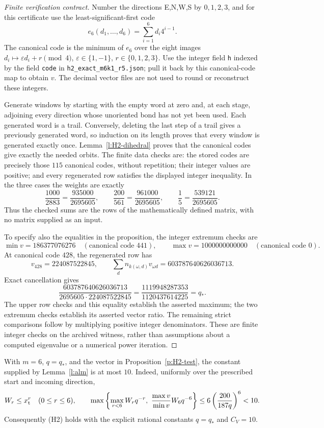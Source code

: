 \begin{proof}[Finite verification contract]
Number the directions E,N,W,S by \(0,1,2,3\), and for this
certificate use the least-significant-first code
\[
 e_6(d_1,\ldots,d_6)=\sum_{i=1}^6d_i4^{i-1}.
\]
The canonical code is the minimum of \(e_6\) over the eight images
\(d_i\mapsto \varepsilon d_i+r\pmod4\),
\(\varepsilon\in\{1,-1\}\), \(r\in\{0,1,2,3\}\).
Use the integer field \texttt{h} indexed by the field \texttt{code}
in \texttt{h2\_exact\_m6k1\_r5.json}; pull it back by this
canonical-code map to obtain \(v\). The decimal vector files are
not used to round or reconstruct these integers.

Generate windows by starting with the empty word at zero and,
at each stage, adjoining every direction whose unoriented bond has
not yet been used. Each generated word is a trail. Conversely,
deleting the last step of a trail gives a previously generated word,
so induction on its length proves that every window is generated
exactly once. Lemma~\ref{l:H2-dihedral} proves that the canonical
codes give exactly the needed orbits. The finite data checks are:
the stored codes are precisely those \(115\) canonical codes,
without repetition; their integer values are positive; and every
regenerated row satisfies the displayed integer inequality.
In the three cases the weights are exactly
\[
 \frac{1000}{2883}=\frac{935000}{2695605},\qquad
 \frac{200}{561}=\frac{961000}{2695605},\qquad
 \frac15=\frac{539121}{2695605}.
\]
Thus the checked sums are the rows of the mathematically defined
matrix, with no matrix supplied as an input.

To specify also the equalities in the proposition, the integer
extremum checks are
\[
 \min v=186377076276\quad(\text{canonical code }441),\qquad
 \max v=1000000000000\quad(\text{canonical code }0).
\]
At canonical code \(428\), the regenerated row has
\[
 v_{428}=224087522845,\qquad
 \sum_d n_{k(\omega,d)}v_{\omega d}=603787640626036713.
\]
Exact cancellation gives
\[
 \frac{603787640626036713}{2695605\cdot224087522845}
 =\frac{1119948287353}{1120437614225}=q_*.
\]
The upper row checks and this equality establish the asserted
maximum; the two extremum checks establish its asserted vector
ratio. The remaining strict comparisons follow by multiplying
positive integer denominators. These are finite integer checks on
the archived witness, rather than assumptions about a computed
eigenvalue or a numerical power iteration.
\end{proof}

\begin{lemma}\label{l:H2-CV}
With \(m=6\), \(q=q_*\), and the vector in Proposition~\ref{p:H2-test},
the constant supplied by Lemma~\ref{l:alm} is at most \(10\).
Indeed, uniformly over the prescribed start and incoming direction,
\[
 W_r\le x_{\rm t}^r\quad(0\le r\le6),\qquad
 \max\left\{\max_{r<6}W_rq^{-r},\
                 \frac{\max v}{\min v}W_6q^{-6}\right\}
 \le6\left(\frac{200}{187q}\right)^6<10.
\]
Consequently (H2) holds with the explicit rational constants
\(q=q_*\) and \(C_V=10\).
\end{lemma}


